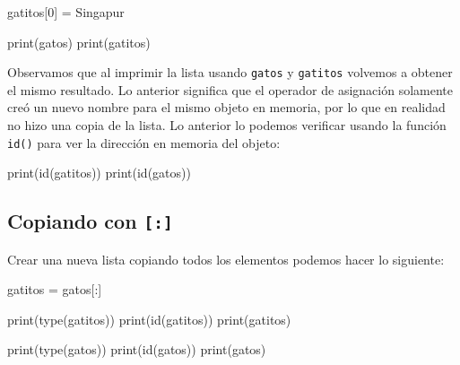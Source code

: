 \documentclass[
  letterpaper,
  DIV=11,
  numbers=noendperiod]{scrreprt}
\newenvironment{Shaded}{\begin{snugshade}}{\end{snugshade}}
\newcommand{\BuiltInTok}[1]{\textcolor[rgb]{0.00,0.23,0.31}{#1}}
\newcommand{\DecValTok}[1]{\textcolor[rgb]{0.68,0.00,0.00}{#1}}
\newcommand{\NormalTok}[1]{\textcolor[rgb]{0.00,0.23,0.31}{#1}}
\newcommand{\OperatorTok}[1]{\textcolor[rgb]{0.37,0.37,0.37}{#1}}
\newcommand{\StringTok}[1]{\textcolor[rgb]{0.13,0.47,0.30}{#1}}
\begin{document}
\begin{Shaded}
\begin{Highlighting}[]
\NormalTok{gatitos[}\DecValTok{0}\NormalTok{] }\OperatorTok{=} \StringTok{\textquotesingle{}Singapur\textquotesingle{}}
\end{Highlighting}
\end{Shaded}

\begin{Shaded}
\begin{Highlighting}[]
\BuiltInTok{print}\NormalTok{(gatos)}
\BuiltInTok{print}\NormalTok{(gatitos)}
\end{Highlighting}
\end{Shaded}

Observamos que al imprimir la lista usando \texttt{gatos} y
\texttt{gatitos} volvemos a obtener el mismo resultado. Lo anterior
significa que el operador de asignación solamente creó un nuevo nombre
para el mismo objeto en memoria, por lo que en realidad no hizo una
copia de la lista. Lo anterior lo podemos verificar usando la función
\texttt{id()} para ver la dirección en memoria del objeto:

\begin{Shaded}
\begin{Highlighting}[]
\BuiltInTok{print}\NormalTok{(}\BuiltInTok{id}\NormalTok{(gatitos))}
\BuiltInTok{print}\NormalTok{(}\BuiltInTok{id}\NormalTok{(gatos))}
\end{Highlighting}
\end{Shaded}

\subsection{\texorpdfstring{Copiando con
\texttt{{[}:{]}}}{Copiando con {[}:{]}}}\label{copiando-con}

Crear una nueva lista copiando todos los elementos podemos hacer lo
siguiente:

\begin{Shaded}
\begin{Highlighting}[]
\NormalTok{gatitos }\OperatorTok{=}\NormalTok{ gatos[:]}
\end{Highlighting}
\end{Shaded}

\begin{Shaded}
\begin{Highlighting}[]
\BuiltInTok{print}\NormalTok{(}\BuiltInTok{type}\NormalTok{(gatitos))}
\BuiltInTok{print}\NormalTok{(}\BuiltInTok{id}\NormalTok{(gatitos))}
\BuiltInTok{print}\NormalTok{(gatitos)}

\BuiltInTok{print}\NormalTok{(}\BuiltInTok{type}\NormalTok{(gatos))}
\BuiltInTok{print}\NormalTok{(}\BuiltInTok{id}\NormalTok{(gatos))}
\BuiltInTok{print}\NormalTok{(gatos)}
\end{Highlighting}
\end{Shaded}
\end{document}

